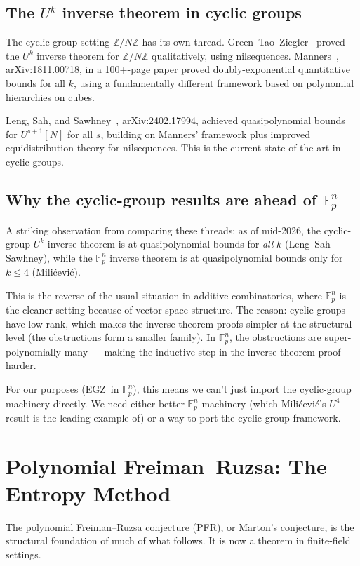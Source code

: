 \documentclass[11pt,a4paper]{article}
\theoremstyle{plain}
\theoremstyle{definition}
\theoremstyle{remark}
\newcommand{\F}{\mathbb{F}}
\newcommand{\Z}{\mathbb{Z}}
\newcommand{\PFR}{\textsf{PFR}}
\newcommand{\EGZ}{\textsf{EGZ}}
\begin{document}
\subsection{The $U^k$ inverse theorem in cyclic groups}

The cyclic group setting $\Z/N\Z$ has its own thread. Green--Tao--Ziegler~\cite{greentaoziegler2012} proved the $U^k$ inverse theorem for $\Z/N\Z$ qualitatively, using nilsequences. Manners~\cite{manners2018}, arXiv:1811.00718, in a 100+-page paper proved doubly-exponential quantitative bounds for all $k$, using a fundamentally different framework based on polynomial hierarchies on cubes.

Leng, Sah, and Sawhney~\cite{lengsahsawhney2024}, arXiv:2402.17994, achieved quasipolynomial bounds for $U^{s+1}[N]$ for all $s$, building on Manners' framework plus improved equidistribution theory for nilsequences. This is the current state of the art in cyclic groups.

\subsection{Why the cyclic-group results are ahead of $\F_p^n$}

A striking observation from comparing these threads: as of mid-2026, the cyclic-group $U^k$ inverse theorem is at quasipolynomial bounds for \emph{all} $k$ (Leng--Sah--Sawhney), while the $\F_p^n$ inverse theorem is at quasipolynomial bounds only for $k \leq 4$ (Milićević).

This is the reverse of the usual situation in additive combinatorics, where $\F_p^n$ is the cleaner setting because of vector space structure. The reason: cyclic groups have low rank, which makes the inverse theorem proofs simpler at the structural level (the obstructions form a smaller family). In $\F_p^n$, the obstructions are super-polynomially many --- making the inductive step in the inverse theorem proof harder.

For our purposes (\EGZ\ in $\F_p^n$), this means we can't just import the cyclic-group machinery directly. We need either better $\F_p^n$ machinery (which Milićević's $U^4$ result is the leading example of) or a way to port the cyclic-group framework.

\section{Polynomial Freiman--Ruzsa: The Entropy Method}

The polynomial Freiman--Ruzsa conjecture (\PFR), or Marton's conjecture, is the structural foundation of much of what follows. It is now a theorem in finite-field settings.
\end{document}

